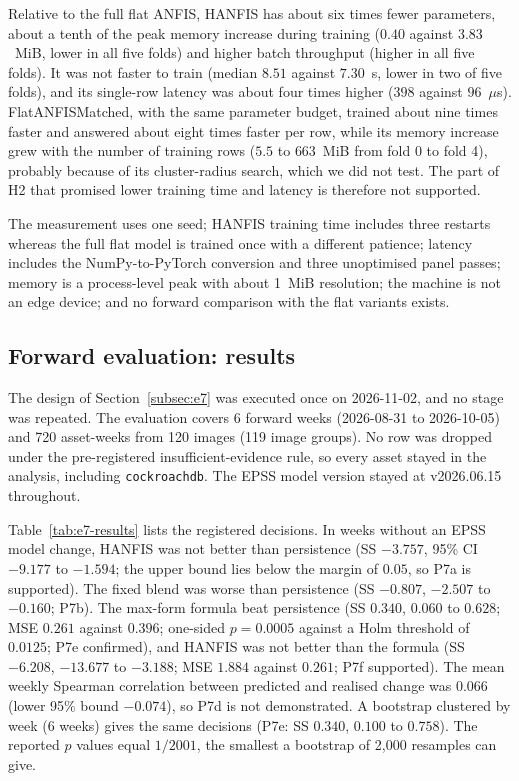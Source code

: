 \documentclass[referee,lineno,pdflatex,sn-basic]{sn-jnl}%
\theoremstyle{thmstyleone}%
\theoremstyle{thmstyletwo}%
\theoremstyle{thmstylethree}%
\begin{document}
Relative to the full flat ANFIS, HANFIS has about six times fewer parameters, about a tenth of the peak memory increase during training ($0.40$ against $3.83$~MiB, lower in all five folds) and higher batch throughput (higher in all five folds). It was not faster to train (median $8.51$ against $7.30$~s, lower in two of five folds), and its single-row latency was about four times higher ($398$ against $96$~$\mu$s). FlatANFISMatched, with the same parameter budget, trained about nine times faster and answered about eight times faster per row, while its memory increase grew with the number of training rows ($5.5$ to $663$~MiB from fold 0 to fold 4), probably because of its cluster-radius search, which we did not test. The part of H2 that promised lower training time and latency is therefore not supported.

The measurement uses one seed; HANFIS training time includes three restarts whereas the full flat model is trained once with a different patience; latency includes the NumPy-to-PyTorch conversion and three unoptimised panel passes; memory is a process-level peak with about 1~MiB resolution; the machine is not an edge device; and no forward comparison with the flat variants exists.

\subsection{Forward evaluation: results}\label{subsec:e7-results}
The design of Section~\ref{subsec:e7} was executed once on 2026-11-02, and no stage was repeated. The evaluation covers 6 forward weeks (2026-08-31 to 2026-10-05) and 720 asset-weeks from 120 images (119 image groups). No row was dropped under the pre-registered insufficient-evidence rule, so every asset stayed in the analysis, including \texttt{cockroachdb}. The EPSS model version stayed at v2026.06.15 throughout.

Table~\ref{tab:e7-results} lists the registered decisions. In weeks without an EPSS model change, HANFIS was not better than persistence (SS $-3.757$, 95\% CI $-9.177$ to $-1.594$; the upper bound lies below the margin of $0.05$, so P7a is supported). The fixed blend was worse than persistence (SS $-0.807$, $-2.507$ to $-0.160$; P7b). The max-form formula beat persistence (SS $0.340$, $0.060$ to $0.628$; MSE $0.261$ against $0.396$; one-sided $p=0.0005$ against a Holm threshold of $0.0125$; P7e confirmed), and HANFIS was not better than the formula (SS $-6.208$, $-13.677$ to $-3.188$; MSE $1.884$ against $0.261$; P7f supported). The mean weekly Spearman correlation between predicted and realised change was $0.066$ (lower 95\% bound $-0.074$), so P7d is not demonstrated. A bootstrap clustered by week (6 weeks) gives the same decisions (P7e: SS $0.340$, $0.100$ to $0.758$). The reported $p$ values equal $1/2001$, the smallest a bootstrap of 2{,}000 resamples can give.
\end{document}
